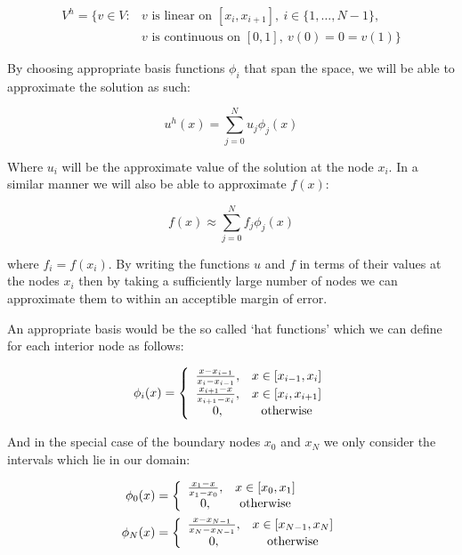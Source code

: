 \begin{align*}
	V^h = \{v \in V: &v \text{ is linear on } [x_i, x_{i+1}],\ i \in \{1, \ldots, N - 1\}, \\
               &v \text{ is continuous on } [0, 1],\ v(0) = 0 = v(1)\}
\end{align*}

By choosing appropriate basis functions $\phi_i$ that span the space, we will be able to approximate 
the solution as such:

\begin{equation}\label{eq:one-d-approx-soln}
	u^h(x) = \sum_{j = 0}^N{u_j\phi_j(x)}
\end{equation}

Where $u_i$ will be the approximate value of the solution at the node $x_i$. In a similar manner we will
also be able to approximate $f(x)$:

\begin{equation}
	f(x) \approx \sum_{j = 0}^N f_j\phi_j(x)
\end{equation}

where $f_i = f(x_i)$. By writing the functions $u$ and $f$ in terms of their values at the nodes $x_i$
then by taking a sufficiently large number of nodes we can approximate them to within an acceptible margin
of error.


An appropriate basis would be the so called `hat functions' which we can define for each interior node
as follows:

\begin{equation}\label{eq:one-d-hat-basis}
	\phi_i(x) = \left\{\begin{array}{c c}
    				\frac{x - x_{i-1}}{x_i - x_{i - 1}}, & x \in [x_{i-1}, x_i] \\
                    \frac{x_{i+1} - x}{x_{i + 1} - x_i}, & x \in [x_i, x_{i + 1}] \\
                    0, & \text{otherwise}
                \end{array}\right.
\end{equation}

And in the special case of the boundary nodes $x_0$ and $x_N$ we only consider the intervals which lie in our
domain:

\begin{align}
	\phi_0(x) &= \left\{\begin{array}{c c}
                    \frac{x_1 - x}{x_1 - x_0}, & x \in [x_0, x_1] \\
                    0, & \text{otherwise}
    \end{array}\right.
    \\
	\phi_N(x) &= \left\{\begin{array}{c c}
                    \frac{x - x_{N - 1}}{x_N - x_{N-1}}, & x \in [x_{N-1}, x_N] \\
                    0, & \text{otherwise}
    \end{array}\right.
\end{align}

